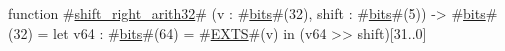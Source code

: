 function #\hyperref[sailRISCVzshiftzyrightzyarith32]{shift\_right\_arith32}# (v : #\hyperref[sailRISCVzbits]{bits}#(32), shift : #\hyperref[sailRISCVzbits]{bits}#(5)) -> #\hyperref[sailRISCVzbits]{bits}#(32) =
    let v64 : #\hyperref[sailRISCVzbits]{bits}#(64) = #\hyperref[sailRISCVzEXTS]{EXTS}#(v) in
    (v64 >> shift)[31..0]
